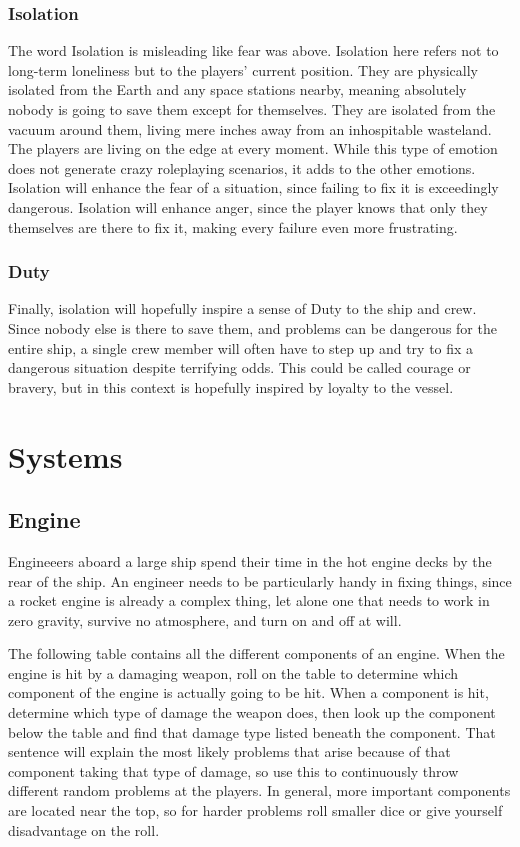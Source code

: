 \documentclass[a4paper]{article}
\begin{document}
\subsubsection{Isolation} \label{isolation}

The word Isolation is misleading like fear was above. Isolation here refers not to long-term loneliness but to the players' current position. They are physically isolated from the Earth and any space stations nearby, meaning absolutely nobody is going to save them except for themselves. They are isolated from the vacuum around them, living mere inches away from an inhospitable wasteland. The players are living on the edge at every moment. While this type of emotion does not generate crazy roleplaying scenarios, it adds to the other emotions. Isolation will enhance the fear of a situation, since failing to fix it is exceedingly dangerous. Isolation will enhance anger, since the player knows that only they themselves are there to fix it, making every failure even more frustrating. 

\subsubsection{Duty} \label{duty}

Finally, isolation will hopefully inspire a sense of Duty to the ship and crew. Since nobody else is there to save them, and problems can be dangerous for the entire ship, a single crew member will often have to step up and try to fix a dangerous situation despite terrifying odds. This could be called courage or bravery, but in this context is hopefully inspired by loyalty to the vessel.


\newpage
\section{Systems} \label{systems}

\subsection{Engine} \label{engine}

Engineeers aboard a large ship spend their time in the hot engine decks by the rear of the ship. An engineer needs to be particularly handy in fixing things, since a rocket engine is already a complex thing, let alone one that needs to work in zero gravity, survive no atmosphere, and turn on and off at will.

The following table contains all the different components of an engine. When the engine is hit by a damaging weapon, roll on the table to determine which component of the engine is actually going to be hit. When a component is hit, determine which type of damage the weapon does, then look up the component below the table and find that damage type listed beneath the component. That sentence will explain the most likely problems that arise because of that component taking that type of damage, so use this to continuously throw different random problems at the players. In general, more important components are located near the top, so for harder problems roll smaller dice or give yourself disadvantage on the roll.
\end{document}
